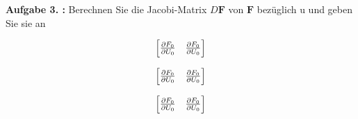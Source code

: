 \begin{mybox}
	\textbf{Aufgabe 3. :} Berechnen Sie die Jacobi-Matrix $D\mathbf{F}$ von $\mathbf{F}$ bezüglich u und geben Sie sie an
\end{mybox}
\begin{equation}
	\begin{bmatrix}
		\pdv{F_0}{U_0} & \pdv{F_0}{U_0}  \\
		
	\end{bmatrix}
\end{equation}

\begin{equation}
	\begin{bmatrix}
		\pdv{F_0}{U_0} & \pdv{F_0}{U_0}  \\
		
	\end{bmatrix}
\end{equation}

\begin{equation}
	\begin{bmatrix}
		\pdv{F_0}{U_0} & \pdv{F_0}{U_0}  \\
		
	\end{bmatrix}
\end{equation}



